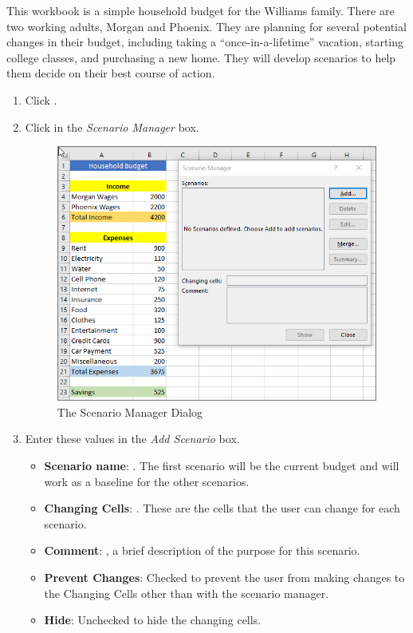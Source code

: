 This workbook is a simple household budget for the Williams family. There are two working adults, Morgan and Phoenix. They are planning for several potential changes in their budget, including taking a ``once-in-a-lifetime'' vacation, starting college classes, and purchasing a new home. They will develop scenarios to help them decide on their best course of action.

\begin{enumbox}
	\begin{enumerate}
		\item Click .
		\item Click  in the \textit{Scenario Manager} box.

		\begin{figure}[H]
			\centering
			\includegraphics[width=\maxwidth{.95\linewidth}]{gfx/ch08_fig50}
			\caption{The Scenario Manager Dialog}
			\label{08:fig50}
		\end{figure}

		\item Enter these values in the \textit{Add Scenario} box.
		\begin{itemize}
			\item \textbf{Scenario name}: . The first scenario will be the current budget and will work as a baseline for the other scenarios.
			\item \textbf{Changing Cells}: . These are the cells that the user can change for each scenario.
			\item \textbf{Comment}: , a brief description of the purpose for this scenario.
			\item \textbf{Prevent Changes}: Checked to prevent the user from making changes to the Changing Cells other than with the scenario manager.
			\item \textbf{Hide}: Unchecked to hide the changing cells.
		\end{itemize}


\end{enumerate}
\end{enumbox}
